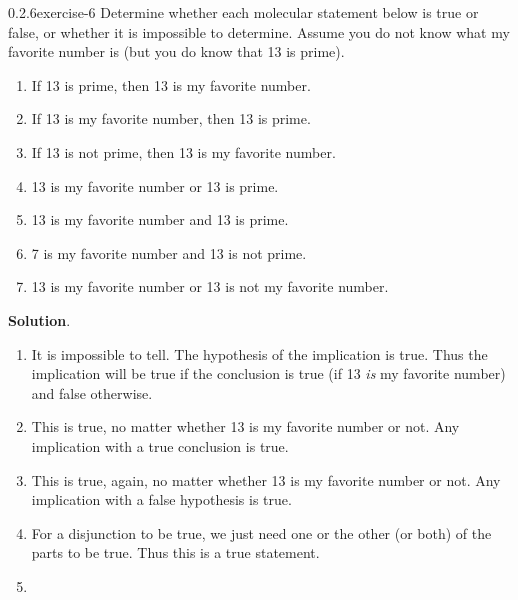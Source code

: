 \documentclass[twoside,11pt,]{book}
\numberwithin{equation}{chapter}
\begin{document}
\begin{divisionsolution}{0.2.6}{}{exercise-6}%
\hypertarget{p-189}{}%
Determine whether each molecular statement below is true or false, or whether it is impossible to determine. Assume you do not know what my favorite number is (but you do know that 13 is prime).\leavevmode%
\begin{enumerate}[label=(\alph*)]
\item\hypertarget{li-127}{}\hypertarget{p-190}{}%
If 13 is prime, then 13 is my favorite number. %
\item\hypertarget{li-132}{}\hypertarget{p-191}{}%
If 13 is my favorite number, then 13 is prime. %
\item\hypertarget{li-137}{}\hypertarget{p-192}{}%
If 13 is not prime, then 13 is my favorite number. %
\item\hypertarget{li-142}{}\hypertarget{p-193}{}%
13 is my favorite number or 13 is prime. %
\item\hypertarget{li-147}{}\hypertarget{p-194}{}%
13 is my favorite number and 13 is prime. %
\item\hypertarget{li-152}{}\hypertarget{p-195}{}%
7 is my favorite number and 13 is not prime. %
\item\hypertarget{li-157}{}\hypertarget{p-196}{}%
13 is my favorite number or 13 is not my favorite number. %
\end{enumerate}
%
\par\smallskip%
\noindent\textbf{Solution}.\quad%
\hypertarget{p-197}{}%
\leavevmode%
\begin{enumerate}[label=(\alph*)]
\item\hypertarget{li-162}{}\hypertarget{p-198}{}%
It is impossible to tell. The hypothesis of the implication is true. Thus the implication will be true if the conclusion is true (if 13 \emph{is} my favorite number) and false otherwise.%
\item\hypertarget{li-163}{}\hypertarget{p-199}{}%
This is true, no matter whether 13 is my favorite number or not. Any implication with a true conclusion is true.%
\item\hypertarget{li-164}{}\hypertarget{p-200}{}%
This is true, again, no matter whether 13 is my favorite number or not. Any implication with a false hypothesis is true.%
\item\hypertarget{li-165}{}\hypertarget{p-201}{}%
For a disjunction to be true, we just need one or the other (or both) of the parts to be true. Thus this is a true statement.%
\item\hypertarget{li-166}{}\hypertarget{p-202}{}%

\end{enumerate}
\end{divisionsolution}
\end{document}
